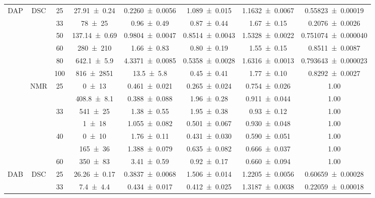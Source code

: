 \begin{table}[!ht]
\begin{tabular}{c|cc ccccc}
    \midrule
        \multirow{13}{*}{DAP} & \multirow{6}{*}{DSC} & 25 & \num{27.91 \pm 0.24} & \num{0.2260 \pm 0.0056} & \num{1.089 \pm 0.015} & \num{1.1632 \pm 0.0067} & \num{0.55823 \pm 0.00019} \\
        ~ & ~ & 33 & \num{78 \pm 25} & \num{0.96 \pm 0.49} & \num{0.87 \pm 0.44} & \num{1.67 \pm 0.15} & \num{0.2076 \pm 0.0026} \\
        ~ & ~ & 50 & \num{137.14 \pm 0.69} & \num{0.9804 \pm 0.0047} & \num{0.8514 \pm 0.0043} & \num{1.5328 \pm 0.0022} & \num{0.751074 \pm 0.000040} \\
        ~ & ~ & 60 & \num{280 \pm 210} & \num{1.66 \pm 0.83} & \num{0.80 \pm 0.19} & \num{1.55 \pm 0.15} & \num{0.8511 \pm 0.0087} \\
        ~ & ~ & 80 & \num{642.1 \pm 5.9} & \num{4.3371 \pm 0.0085} & \num{0.5358 \pm 0.0028} & \num{1.6316 \pm 0.0013} & \num{0.793643 \pm 0.000023} \\
        ~ & ~ & 100 & \num{816 \pm 2851} & \num{13.5 \pm 5.8} & \num{0.45 \pm 0.41} & \num{1.77 \pm 0.10} & \num{0.8292 \pm 0.0027} \\
        \cline{2-8}
        ~ & \multirow{7}{*}{NMR} & \multirow{2}{*}{25} & \num{0 \pm 13} & \num{0.461 \pm 0.021} & \num{0.265 \pm 0.024} & \num{0.754 \pm 0.026} & 1.00 \\
        ~ & ~ & ~ & \num{408.8 \pm 8.1} & \num{0.388 \pm 0.088} & \num{1.96 \pm 0.28} & \num{0.911 \pm 0.044} & 1.00 \\
        ~ & ~ & \multirow{2}{*}{33} & \num{541 \pm 25} & \num{1.38 \pm 0.55} & \num{1.95 \pm 0.38} & \num{0.93 \pm 0.12} & 1.00 \\
        ~ & ~ & ~ & \num{1 \pm 18} & \num{1.055 \pm 0.082} & \num{0.501 \pm 0.067} & \num{0.930 \pm 0.048} & 1.00 \\
        ~ & ~ & \multirow{2}{*}{40} & \num{0 \pm 10} & \num{1.76 \pm 0.11} & \num{0.431 \pm 0.030} & \num{0.590 \pm 0.051} & 1.00 \\
        ~ & ~ & ~ & \num{165 \pm 36} & \num{1.388 \pm 0.079} & \num{0.635 \pm 0.082} & \num{0.666 \pm 0.037} & 1.00 \\
        ~ & ~ & \multirow{1}{*}{60} & \num{350 \pm 83} & \num{3.41 \pm 0.59} & \num{0.92 \pm 0.17} & \num{0.660 \pm 0.094} & 1.00 \\
    \midrule
        \multirow{10}{*}{DAB} & \multirow{6}{*}{DSC} & 25 & \num{26.26 \pm 0.17} & \num{0.3837 \pm 0.0068} & \num{1.506 \pm 0.014} & \num{1.2205 \pm 0.0056} & \num{0.60659 \pm 0.00028} \\
        ~ & ~ & 33 & \num{7.4 \pm 4.4} & \num{0.434 \pm 0.017} & \num{0.412 \pm 0.025} & \num{1.3187 \pm 0.0038} & \num{0.22059 \pm 0.00018} \\

\end{tabular}
\end{table}
